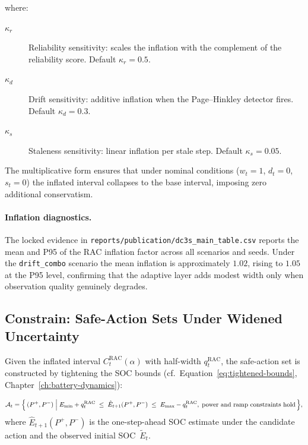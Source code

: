 where:
\begin{description}
  \item[$\kappa_r$] Reliability sensitivity: scales the inflation with the
    complement of the reliability score.  Default $\kappa_r = 0.5$.
  \item[$\kappa_d$] Drift sensitivity: additive inflation when the
    Page--Hinkley detector fires.  Default $\kappa_d = 0.3$.
  \item[$\kappa_s$] Staleness sensitivity: linear inflation per stale step.
    Default $\kappa_s = 0.05$.
\end{description}

The multiplicative form ensures that under nominal conditions
($w_t = 1$, $d_t = 0$, $s_t = 0$) the inflated interval collapses to the
base interval, imposing zero additional conservatism.

\paragraph{Inflation diagnostics.}
The locked evidence in \texttt{reports/publication/dc3s\_main\_table.csv}
reports the mean and P95 of the RAC inflation factor across all scenarios
and seeds.  Under the \texttt{drift\_combo} scenario the mean inflation
is approximately $1.02$, rising to $1.05$ at the P95 level, confirming that
the adaptive layer adds modest width only when observation quality genuinely
degrades.

\subsection{Constrain: Safe-Action Sets Under Widened Uncertainty}
\label{sec:constrain}

Given the inflated interval $C_t^{\mathrm{RAC}}(\alpha)$ with half-width
$q_t^{\mathrm{RAC}}$, the safe-action set is constructed by tightening
the SOC bounds (cf.\ Equation~\eqref{eq:tightened-bounds},
Chapter~\ref{ch:battery-dynamics}):

\begin{equation}
\label{eq:safe-action-set}
  \mathcal{A}_t = \Bigl\{\,(P^{+}, P^{-}) \;\Big|\;
    E_{\min} + q_t^{\mathrm{RAC}} \;\le\; \hat{E}_{t+1}(P^{+}, P^{-})
    \;\le\; E_{\max} - q_t^{\mathrm{RAC}},\;
    \text{power and ramp constraints hold}\,\Bigr\},
\end{equation}
where $\hat{E}_{t+1}(P^{+}, P^{-})$ is the one-step-ahead SOC estimate
under the candidate action and the observed initial SOC~$\tilde{E}_t$.

